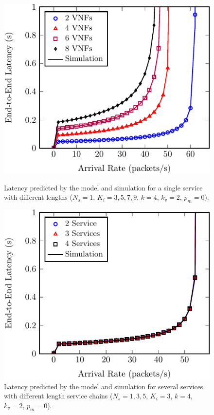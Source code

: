 \begin{figure}
	\vspace{2mm}

	\begin{minipage}[b]{.49\textwidth}
		\includegraphics[width=\linewidth]{graphs/diff_lengths-crop}
		\caption{Latency predicted by the model and simulation for a single service with different lengths ($N_s=1$, $K_i={3,5,7,9}$, $k=4$, $k_v =2$, $p_m=0$).}
		\label{fig:length_chain}
	\end{minipage}
	\hfill
	\begin{minipage}[b]{.49\textwidth}
		\includegraphics[width=\linewidth]{graphs/mult_services-crop}
		\caption{Latency predicted by the model and simulation for several services
		with different length service chains ($N_s={1,3,5}$, $K_i=3$, $k=4$, $k_v=2$, $p_m=0$).}
		\label{fig:mult_services}
	\end{minipage}

\end{figure}

